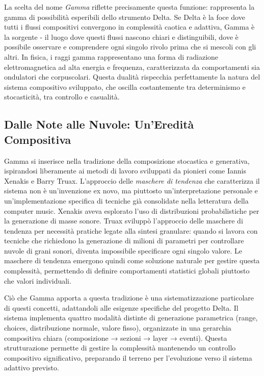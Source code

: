 La scelta del nome \textit{Gamma} riflette precisamente questa funzione: rappresenta la gamma di possibilità esperibili dello strumento Delta. Se Delta è la foce dove tutti i flussi compositivi convergono in complessità caotica e adattiva, Gamma è la sorgente - il luogo dove questi flussi nascono chiari e distinguibili, dove è possibile osservare e comprendere ogni singolo rivolo prima che si mescoli con gli altri. In fisica, i raggi gamma rappresentano una forma di radiazione elettromagnetica ad alta energia e frequenza, caratterizzata da comportamenti sia ondulatori che corpuscolari. Questa dualità rispecchia perfettamente la natura del sistema compositivo sviluppato, che oscilla costantemente tra determinismo e stocasticità, tra controllo e casualità.
\subsection{Dalle Note alle Nuvole: Un'Eredità Compositiva}
Gamma si inserisce nella tradizione della composizione stocastica e generativa, ispirandosi liberamente ai metodi di lavoro sviluppati da pionieri come Iannis Xenakis e Barry Truax. L'approccio delle \textit{maschere di tendenza} che caratterizza il sistema non è un'invenzione ex novo, ma piuttosto un'interpretazione personale e un'implementazione specifica di tecniche già consolidate nella letteratura della computer music. Xenakis aveva esplorato l'uso di distribuzioni probabilistiche per la generazione di masse sonore. Truax sviluppò l'approccio delle maschere di tendenza per necessità pratiche legate alla sintesi granulare: quando si lavora con tecniche che richiedono la generazione di milioni di parametri per controllare nuvole di grani sonori, diventa impossibile specificare ogni singolo valore. Le maschere di tendenza emergono quindi come soluzione naturale per gestire questa complessità, permettendo di definire comportamenti statistici globali piuttosto che valori individuali.

Ciò che Gamma apporta a questa tradizione è una sistematizzazione particolare di questi concetti, adattandoli alle esigenze specifiche del progetto Delta. Il sistema implementa quattro modalità distinte di generazione parametrica (range, choices, distribuzione normale, valore fisso), organizzate in una gerarchia compositiva chiara (composizione → sezioni → layer → eventi). Questa strutturazione permette di gestire la complessità mantenendo un controllo compositivo significativo, preparando il terreno per l'evoluzione verso il sistema adattivo previsto.

